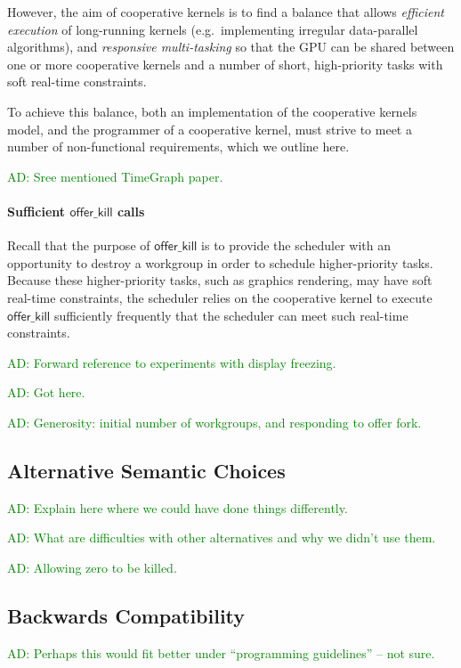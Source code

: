 \documentclass[nocopyrightspace]{sigplanconf-pldi16}
\newcommand{\ADComment}[1]{\textcolor{green}{AD: #1}}
\newcommand{\offerkill}{\mathsf{offer\_kill}}
\begin{document}
However, the aim of cooperative kernels is to find a balance that
allows \emph{efficient execution} of long-running kernels
(e.g.\ implementing irregular data-parallel algorithms), and
\emph{responsive multi-tasking} so that the GPU can be shared between
one or more cooperative kernels and a number of short, high-priority
tasks with soft real-time constraints.

To achieve this balance, both an implementation of the cooperative
kernels model, and the programmer of a cooperative kernel, must strive
to meet a number of non-functional requirements, which we outline
here.

\ADComment{Sree mentioned TimeGraph paper.}

\paragraph{Sufficient $\offerkill$ calls}

Recall that the purpose of $\offerkill$ is to provide the scheduler
with an opportunity to destroy a workgroup in order to schedule
higher-priority tasks.  Because these higher-priority tasks, such as
graphics rendering, may have soft real-time constraints, the scheduler
relies on the cooperative kernel to execute $\offerkill$ sufficiently
frequently that the scheduler can meet such real-time constraints.

\ADComment{Forward reference to experiments with display freezing.}

\ADComment{Got here.}

\ADComment{Generosity: initial number of workgroups, and responding to offer fork.}

\subsection{Alternative Semantic Choices}\label{sec:semanticalternatives}

\ADComment{Explain here where we could have done things differently.}

\ADComment{What are difficulties with other alternatives and why we didn't use them.}

\ADComment{Allowing zero to be killed.}

\subsection{Backwards Compatibility}\label{sec:backwardscompatibility}

\ADComment{Perhaps this would fit better under ``programming guidelines'' -- not sure.}
\end{document}
